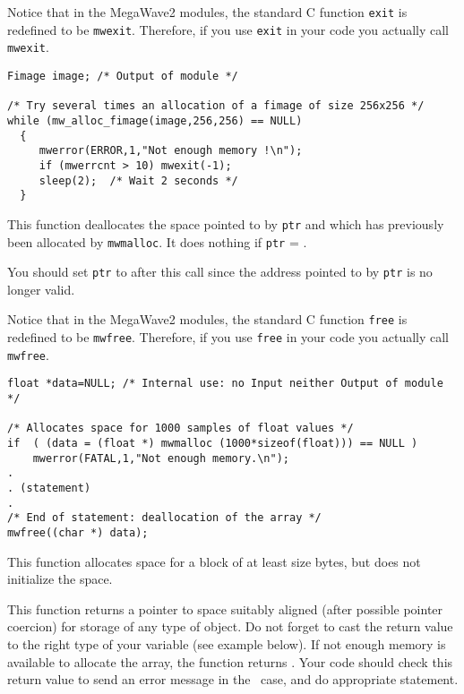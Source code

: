 Notice that in the MegaWave2 modules, the standard C function \verb+exit+ is
redefined to be \verb+mwexit+. 
Therefore, if you use \verb+exit+ in your code you actually call \verb+mwexit+.

\Next
\Example
\begin{verbatim}
Fimage image; /* Output of module */

/* Try several times an allocation of a fimage of size 256x256 */
while (mw_alloc_fimage(image,256,256) == NULL)
  {
     mwerror(ERROR,1,"Not enough memory !\n");
     if (mwerrcnt > 10) mwexit(-1);
     sleep(2);  /* Wait 2 seconds */
  }
\end{verbatim}

\newpage %

\Description
This function deallocates the space pointed to by 
\verb+ptr+ and which has previously been allocated by \verb+mwmalloc+. It does 
nothing if \verb+ptr+ = \Null.

You should set \verb+ptr+ to \Null after this call since the address pointed to by \verb+ptr+ is no longer valid.

Notice that in the MegaWave2 modules, the standard C function \verb+free+ is
redefined to be \verb+mwfree+. 
Therefore, if you use \verb+free+ in your code you actually call \verb+mwfree+.

\Next
\Example
\begin{verbatim}
float *data=NULL; /* Internal use: no Input neither Output of module */

/* Allocates space for 1000 samples of float values */
if  ( (data = (float *) mwmalloc (1000*sizeof(float))) == NULL )
    mwerror(FATAL,1,"Not enough memory.\n");
.
. (statement)
.
/* End of statement: deallocation of the array */
mwfree((char *) data);
\end{verbatim}

\newpage %

\Description
This function allocates space for a block of at least size bytes, but does not initialize the space.

This function returns a pointer to space suitably aligned (after possible pointer coercion) for storage of any type of object. 
Do not forget to cast the return value to the right type of your variable
(see example below).
If not enough memory is available to allocate the array, the function returns \Null. 
Your code should check this return value to send an error message in the \Null\ case, and do appropriate statement.

